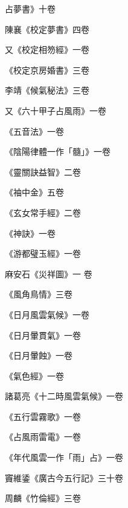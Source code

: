 \begin{pinyinscope}
 占夢書》十卷



 陳襄《校定夢書》四卷



 又《校定相笏經》一卷



 《校定京房婚書》三卷



 李靖《候氣秘法》三卷



 又《六十甲子占風雨》一卷



 《五音法》一卷



 《陰陽律體一作「髓」》一卷



 《靈關訣益智》二卷



 《袖中金》五卷



 《玄女常手經》二卷



 《神訣》一卷



 《游都璧玉經》一卷



 麻安石《災祥圖》一
 卷



 《風角鳥情》三卷



 《日月風雲氣候》一卷



 《日月暈貫氣》一卷



 《日月暈蝕》一卷



 《氣色經》一卷



 諸葛亮《十二時風雲氣候》一卷



 《五行雲霧歌》一卷



 《占風雨雷電》一卷



 《年代風雲一作「雨」占》一卷



 竇維鋈《廣古今五行記》三十卷



 周麟《竹倫經》三卷




\end{pinyinscope}
